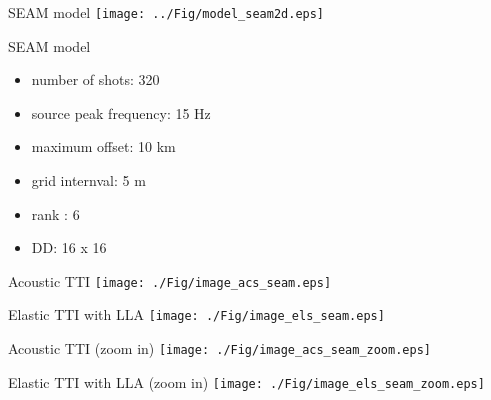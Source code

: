 \documentclass[aspectratio=169]{beamer}
\begin{document}
\begin{frame}{SEAM model}
  \texttt{[image: ../Fig/model\_seam2d.eps]}
\end{frame}
\begin{frame}{SEAM model}
\begin{itemize}
\item{number of shots: 320}
\item{source peak frequency: 15 Hz}
\item{maximum offset: 10 km}
\item{grid internval: 5 m}
\item{rank : 6}
\item{DD: 16 x 16}
\end{itemize}
\end{frame}
\begin{frame}{Acoustic TTI}
\center
  \texttt{[image: ./Fig/image\_acs\_seam.eps]}
\end{frame}
\begin{frame}{Elastic TTI with LLA}
\center
  \texttt{[image: ./Fig/image\_els\_seam.eps]}
\end{frame}
\begin{frame}{Acoustic TTI (zoom in)}
\center
  \texttt{[image: ./Fig/image\_acs\_seam\_zoom.eps]}
\end{frame}
\begin{frame}{Elastic TTI with LLA (zoom in)}
\center
  \texttt{[image: ./Fig/image\_els\_seam\_zoom.eps]}
\end{frame}
\end{document}
